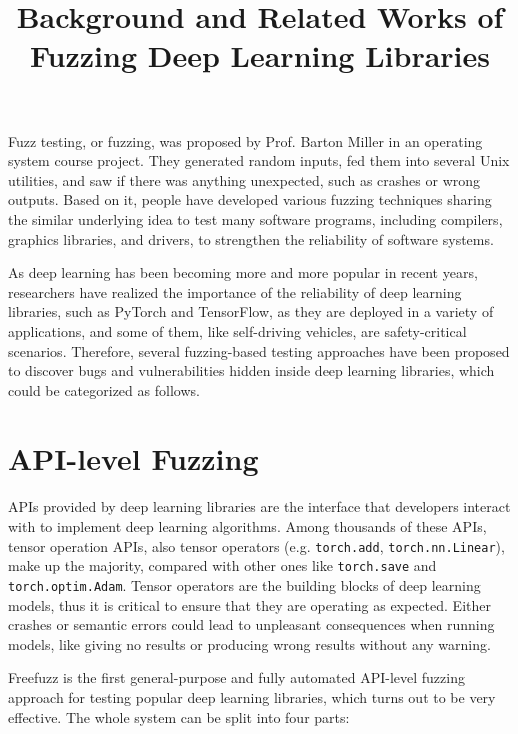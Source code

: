 
\begin{survey}
\label{cha:survey}

\title{Background and Related Works of Fuzzing Deep Learning Libraries}
\maketitle

\tableofcontents

Fuzz testing, or fuzzing, was proposed by Prof. Barton Miller in an operating system course project. They generated random inputs, fed them into several Unix utilities, and saw if there was anything unexpected, such as crashes or wrong outputs. Based on it, people have developed various fuzzing techniques sharing the similar underlying idea to test many software programs, including compilers, graphics libraries, and drivers, to strengthen the reliability of software systems.

As deep learning has been becoming more and more popular in recent years, researchers have realized the importance of the reliability of deep learning libraries, such as PyTorch and TensorFlow, as they are deployed in a variety of applications, and some of them, like self-driving vehicles, are safety-critical scenarios. Therefore, several fuzzing-based testing approaches have been proposed to discover bugs and vulnerabilities hidden inside deep learning libraries, which could be categorized as follows.

\section{API-level Fuzzing}

APIs provided by deep learning libraries are the interface that developers interact with to implement deep learning algorithms. Among thousands of these APIs, tensor operation APIs, also tensor operators (e.g. \texttt{torch.add}, \texttt{torch.nn.Linear}), make up the majority, compared with other ones like \texttt{torch.save} and \texttt{torch.optim.Adam}. Tensor operators are the building blocks of deep learning models, thus it is critical to ensure that they are operating as expected. Either crashes or semantic errors could lead to unpleasant consequences when running models, like giving no results or producing wrong results without any warning.

Freefuzz is the first general-purpose and fully automated API-level fuzzing approach for testing popular deep learning libraries, which turns out to be very effective. The whole system can be split into four parts:


\end{survey}
